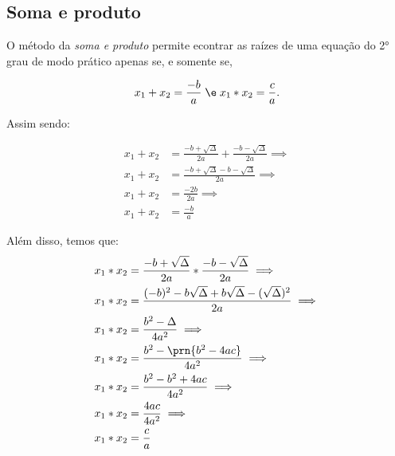 \subsection{Soma e produto}

O método da \emph{soma e produto} permite econtrar as raízes de uma equação do 2° grau de modo prático apenas se, e somente se,

\begin{align*}
    x_1 + x_2 = \dfrac {-b} a \; \e \; x_1 * x_2 = \dfrac c a.
\end{align*}

Assim sendo:

\begin{align*}
    x_1 + x_2 &= \frac{ -b + \sqrt{\Delta}}{2a} + \frac{ -b - \sqrt{\Delta}}{2a} \implies\\
    x_1 + x_2 &= \frac{ -b + \sqrt{\Delta} -b - \sqrt{\Delta}}{2a} \implies\\
    x_1 + x_2 &= \frac{-2b}{2a} \implies\\
    x_1 + x_2 &= \frac{-b}{a}
\end{align*}

Além disso, temos que:
\begin{align*}
    x_1 * x_2 &= \frac{ -b + \sqrt{\Delta}}{2a} * \frac{ -b - \sqrt{\Delta}}{2a} \implies\\
    x_1 * x_2 &= \frac{ (-b)^2 -b\sqrt{\Delta} + b\sqrt{\Delta} -(\sqrt{\Delta})^2}{2a} \implies\\
    x_1 * x_2 &= \frac{b^2 - \Delta}{4a^2} \implies\\
    x_1 * x_2 &= \frac{b^2 - \prn{b^2 - 4ac}}{4a^2} \implies\\
    x_1 * x_2 &= \frac{b^2 - b^2 + 4ac}{4a^2} \implies \\
    x_1 * x_2 &= \frac{4ac}{4a^2} \implies \\
    x_1 * x_2 &= \frac{c}{a}
\end{align*}

